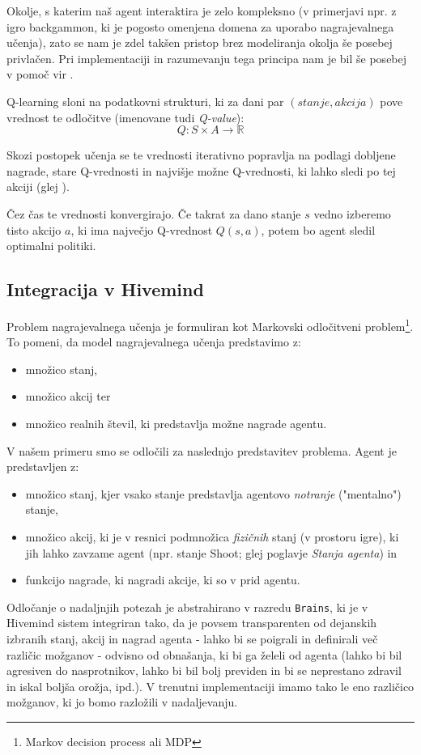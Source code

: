 \documentclass[a4paper,10pt]{article}
\begin{document}
Okolje, s katerim naš agent interaktira je zelo kompleksno (v primerjavi npr. z igro backgammon, ki je pogosto omenjena domena za uporabo nagrajevalnega učenja), zato se nam je zdel takšen pristop brez modeliranja okolja še posebej privlačen. Pri implementaciji in razumevanju tega principa nam je bil še posebej v pomoč vir \cite{rl}.

Q-learning sloni na podatkovni strukturi, ki za dani par $(stanje, akcija)$ pove vrednost te odločitve (imenovane tudi \textit{Q-value}):
$$Q: S\times A \rightarrow \mathbb{R}$$

\noindent
Skozi postopek učenja se te vrednosti iterativno popravlja na podlagi dobljene nagrade, stare Q-vrednosti in najvišje možne Q-vrednosti, ki lahko sledi po tej akciji (glej \cite{ql}).

Čez čas te vrednosti konvergirajo. Če takrat za dano stanje $s$ vedno izberemo tisto akcijo $a$, ki ima največjo Q-vrednost $Q(s, a)$, potem bo agent sledil optimalni politiki.

\subsection{Integracija v Hivemind} \label{sec:mozgani}
Problem nagrajevalnega učenja je formuliran kot Markovski odločitveni problem\footnote{Markov decision process ali MDP}. To pomeni, da model nagrajevalnega učenja
predstavimo z:

\begin{itemize}
 \item množico stanj,
 \item množico akcij ter
 \item množico realnih števil, ki predstavlja možne nagrade agentu.
\end{itemize}
V našem primeru smo se odločili za naslednjo predstavitev problema. Agent je predstavljen z:
\begin{itemize}
 \item množico stanj, kjer vsako stanje predstavlja agentovo \textit{notranje} ("mentalno") stanje,
 \item množico akcij, ki je v resnici podmnožica \textit{fizičnih} stanj (v prostoru igre), ki jih lahko zavzame agent (npr. stanje Shoot; glej poglavje \textit{Stanja agenta}) in
 \item funkcijo nagrade, ki nagradi akcije, ki so v prid agentu.
\end{itemize}

Odločanje o nadaljnjih potezah je abstrahirano v razredu \verb+Brains+, ki je v Hivemind sistem integriran tako, da je povsem transparenten od dejanskih izbranih stanj, akcij in nagrad agenta - lahko bi se poigrali in definirali več različic možganov - odvisno od obnašanja, ki bi ga želeli od agenta (lahko bi bil agresiven do nasprotnikov, lahko bi bil bolj previden in bi se neprestano zdravil in iskal boljša orožja, ipd.). V trenutni implementaciji imamo tako le eno različico možganov, ki jo bomo razložili v nadaljevanju.
\end{document}
